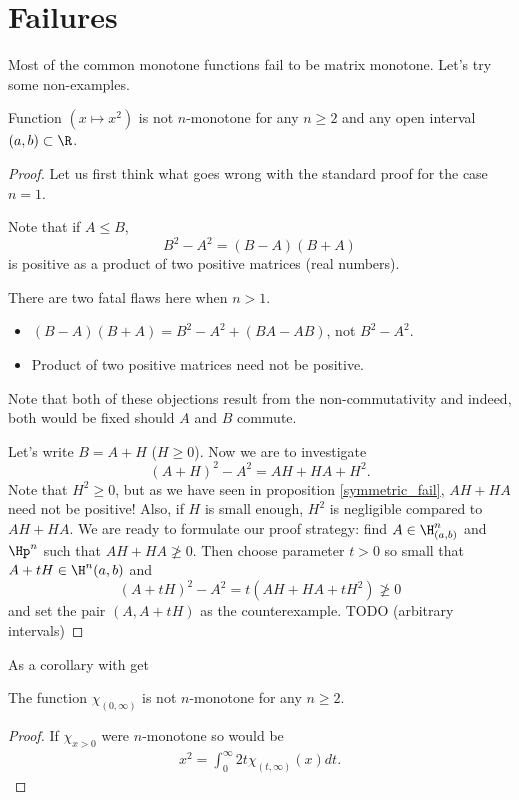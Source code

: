\section{Failures}

Most of the common monotone functions fail to be matrix monotone. Let's try some non-examples.

\begin{prop}
	Function $(x \mapsto x^2)$ is not $n$-monotone for any $n \geq 2$ and any open interval $(a, b) \subset \R$.
\end{prop}
\begin{proof}
	Let us first think what goes wrong with the standard proof for the case $n = 1$.

	Note that if $A \leq B$,
	\[
		B^2 - A^2 = (B - A) (B + A)
	\]
	is positive as a product of two positive matrices (real numbers).

	There are two fatal flaws here when $n > 1$.
	\begin{itemize}
		\item $(B - A) (B + A) = B^2-A^2 + (B A - A B)$, not $B^2 - A^2$.
		\item Product of two positive matrices need not be positive.
	\end{itemize}
	Note that both of these objections result from the non-commutativity and indeed, both would be fixed should $A$ and $B$ commute.

	Let's write $B = A + H$ ($H \geq 0$). Now we are to investigate
	\[
		(A + H)^2-A^2 = A H + H A + H^2.
	\]
	Note that $H^2 \geq 0$, but as we have seen in proposition \ref{symmetric_fail}, $A H + H A$ need not be positive! Also, if $H$ is small enough, $H^2$ is negligible compared to $AH + HA$. We are ready to formulate our proof strategy: find $A \in \H^{n}_{(a, b)}$ and $\Hp^{n}$ such that $A H + H A \ngeq 0$. Then choose parameter $t > 0$ so small that $A + t H \in \H^{n}(a,b)$ and
	\[
		(A + t H)^2 - A^2 = t (A H + H A + t H^2) \ngeq 0
	\]
	and set the pair $(A, A + t H)$ as the counterexample.
	TODO (arbitrary intervals)
\end{proof}

As a corollary with get

\begin{kor}\label{chimon}
	The function $\chi_{(0, \infty)}$ is not $n$-monotone for any $n \geq 2$.
\end{kor}

\begin{proof}
	If $\chi_{x > 0}$ were $n$-monotone so would be
	\begin{align*}
		x^2 = \int_{0}^{\infty} 2 t \chi_{(t, \infty)}(x) dt.
	\end{align*}
\end{proof}

